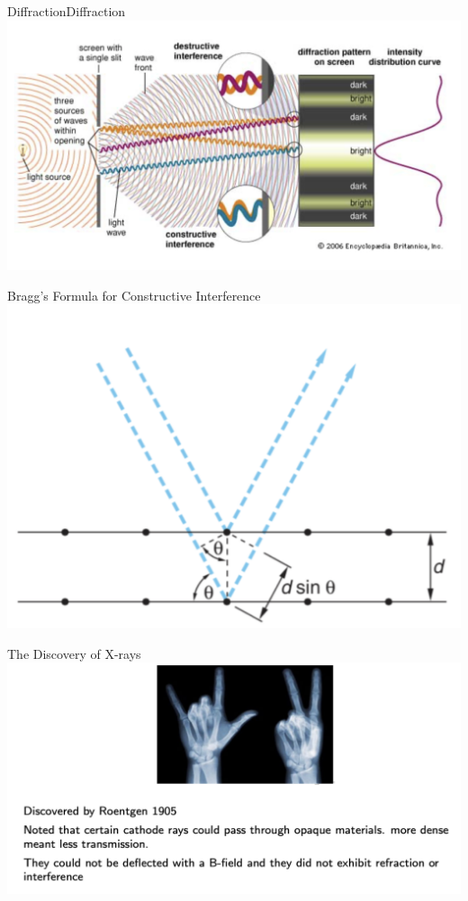 \begin{frame}{Diffraction}{Diffraction}
\small
\includegraphics[scale=0.3]{diff1}


\end{frame}


\begin{frame}{Bragg's Formula for Constructive Interference}
\small
\includegraphics[scale=0.3]{2dsintheta}


\end{frame}


\begin{frame}{The Discovery of X-rays}
\small
\includegraphics[scale=0.3]{xrays1}

\end{frame}


